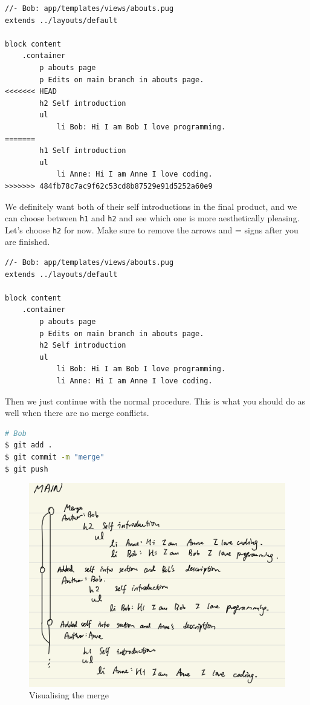 \begin{lstlisting}[language=pug]
//- Bob: app/templates/views/abouts.pug
extends ../layouts/default

block content
	.container
		p abouts page
		p Edits on main branch in abouts page.
<<<<<<< HEAD
		h2 Self introduction
		ul
			li Bob: Hi I am Bob I love programming.
=======
		h1 Self introduction
		ul
			li Anne: Hi I am Anne I love coding.
>>>>>>> 484fb78c7ac9f62c53cd8b87529e91d5252a60e9
\end{lstlisting}

We definitely want both of their self introductions in the final product, and we can choose between \texttt{h1} and \texttt{h2} and see which one is more aesthetically pleasing. Let's choose \texttt{h2} for now. Make sure to remove the arrows and = signs after you are finished. 
\vspace{6mm}

\begin{lstlisting}[language=pug]
//- Bob: app/templates/views/abouts.pug
extends ../layouts/default

block content
	.container
		p abouts page
		p Edits on main branch in abouts page.
		h2 Self introduction
		ul
			li Bob: Hi I am Bob I love programming.
			li Anne: Hi I am Anne I love coding.
\end{lstlisting}
\vspace{6mm}

Then we just continue with the normal procedure. This is what you should do as well when there are no merge conflicts.
\vspace{6mm}

\begin{lstlisting}[language=bash]
# Bob
$ git add .
$ git commit -m "merge"
$ git push
\end{lstlisting}

\begin{figure}[h]
\centering
\includegraphics[width=15cm]{images/chn5-same-branch-merge.png}
\caption{Visualising the merge}
\end{figure}

